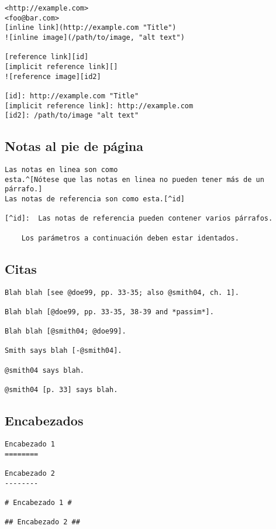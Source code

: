 \documentclass[12pt,spanish,]{article}
\begin{document}
\begin{verbatim}
<http://example.com>
<foo@bar.com>
[inline link](http://example.com "Title")
![inline image](/path/to/image, "alt text")

[reference link][id]
[implicit reference link][]
![reference image][id2]

[id]: http://example.com "Title"
[implicit reference link]: http://example.com
[id2]: /path/to/image "alt text"
\end{verbatim}

\subsection{Notas al pie de página}\label{notas-al-pie-de-puxe1gina}

\begin{verbatim}
Las notas en linea son como
esta.^[Nótese que las notas en linea no pueden tener más de un párrafo.]
Las notas de referencia son como esta.[^id]

[^id]:  Las notas de referencia pueden contener varios párrafos.

    Los parámetros a continuación deben estar identados.
\end{verbatim}

\subsection{Citas}\label{citas}

\begin{verbatim}
Blah blah [see @doe99, pp. 33-35; also @smith04, ch. 1].

Blah blah [@doe99, pp. 33-35, 38-39 and *passim*].

Blah blah [@smith04; @doe99].

Smith says blah [-@smith04].

@smith04 says blah.

@smith04 [p. 33] says blah.
\end{verbatim}

\subsection{Encabezados}\label{encabezados}

\begin{verbatim}
Encabezado 1
========

Encabezado 2
--------

# Encabezado 1 #

## Encabezado 2 ##
\end{verbatim}
\end{document}
